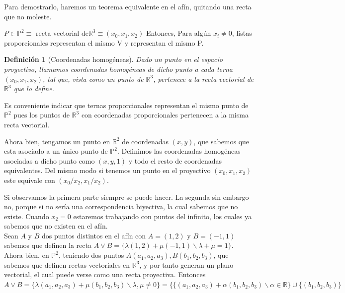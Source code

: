 \documentclass[11pt, a4paper]{article}
\makeatletter
\newif\IfInSansMode
\let\oldsf\sffamily
\renewcommand*{\sffamily}{\oldsf\mathversion{sans}\InSansModetrue}
\let\oldnorm\normalfont
\renewcommand*{\normalfont}{\oldnorm\InSansModefalse\mathversion{normal}}
\renewenvironment{proof}[1][\proofname] {\vspace{-15pt}\par\pushQED{\qed}\normalfont\topsep6\p@\@plus6\p@\relax\trivlist\item[\hskip\labelsep\it#1\@addpunct{.}]\ignorespaces}{\popQED\endtrivlist\@endpefalse}
\renewenvironment{proof}[1][\proofname] {\par\pushQED{\qed}\normalfont\topsep6\p@\@plus6\p@\relax\trivlist\item[\hskip\labelsep\itshape\sffamily#1\@addpunct{.}]\ignorespaces}{\popQED\endtrivlist\@endpefalse}
\theoremstyle{theorem-style}
\theoremstyle{definition-style}
\newtheorem{ndef}{Definición}[section]
\theoremstyle{remark-style}
\theoremstyle{example-style}
\makeatother
\begin{document}
\begin{proof}
	Para demostrarlo, haremos un teorema equivalente en el afín, quitando una recta que no moleste.
\end{proof}

	$P \in \mathbb{P}^2 \equiv$ recta vectorial de$ \mathbb{R}^3 \equiv (x_0,x_1,x_2) $
	Entonces, Para algún $x_i \ne 0$, listas proporcionales representan el mismo V y representan el mismo P.

\begin{ndef}[Coordenadas homogéneas]
Dado un punto en el espacio proyectivo, llamamos coordenadas homogéneas de dicho punto a cada terna $(x_0,x_1,x_2)$, tal que, vista como un punto de $\mathbb{R}^3$, pertenece a la recta vectorial de $\mathbb{R}^3$ que lo define.
\end{ndef}

Es conveniente indicar que ternas proporcionales representan el mismo punto de $\mathbb{P}^2$ pues los puntos de $\mathbb{R}^3$ con coordenadas proporcionales pertenecen a la misma recta vectorial.

Ahora bien, tengamos un punto en $\mathbb{R}^2$ de coordenadas $(x,y)$, que sabemos que esta asociado a un único punto de $\mathbb{P}^2$. Definimos las coordenadas homogéneas asociadas a dicho punto como $(x,y,1)$ y todo el resto de coordenadas equivalentes. Del mismo modo si tenemos un punto en el proyectivo  $(x_0, x_1, x_2)$ este equivale con $(x_0/x_2, x_1/x_2)$. 

Si observamos la primera parte siempre se puede hacer. La segunda sin embargo no, porque si no sería una correspondencia biyectiva, la cual sabemos que no existe. Cuando $x_2 = 0$ estaremos trabajando con puntos del infinito, los cuales ya sabemos que no existen en el afín.\\

Sean $A$ y $B$ dos puntos distintos en el afín con $A =(1,2)$ y $B=(-1,1)$ sabemos que definen la recta $A \vee B = \{ \lambda (1,2) + \mu (-1,1) \backslash \lambda + \mu = 1\}$.\\
Ahora bien, en $\mathbb{P}^2$, teniendo dos puntos $A(a_1,a_2,a_3), B(b_1,b_2,b_3)$, que sabemos que definen rectas vectoriales en $\mathbb{R}^3$, y por tanto generan un plano vectorial, el cual puede verse como una recta proyectiva. Entonces $A\vee B = \{ \lambda (a_1,a_2,a_3) + \mu (b_1,b_2,b_3)\backslash \lambda, \mu \ne 0 \} = \{  \{ (a_1,a_2,a_3) + \alpha (b_1,b_2,b_3)\backslash \alpha  \in \mathbb{R}\} \cup  \{(b_1,b_2,b_3) \}$
\end{document}
